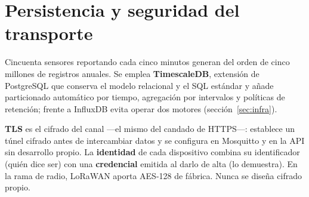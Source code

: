 

\section{Persistencia y seguridad del transporte}
\label{sec:persistencia}

Cincuenta sensores reportando cada cinco minutos generan del orden de cinco millones de registros
anuales. Se emplea \textbf{TimescaleDB}, extensión de PostgreSQL que conserva el modelo relacional y el
SQL estándar y añade particionado automático por tiempo, agregación por intervalos y políticas de
retención; frente a InfluxDB evita operar dos motores (sección~\ref{sec:infra}).

\textbf{TLS} es el cifrado del canal —el mismo del candado de HTTPS—: establece un túnel cifrado antes
de intercambiar datos y se configura en Mosquitto y en la API sin desarrollo propio. La
\textbf{identidad} de cada dispositivo combina su identificador (quién dice ser) con una
\textbf{credencial} emitida al darlo de alta (lo demuestra). En la rama de radio, LoRaWAN aporta
AES-128 de fábrica. Nunca se diseña cifrado propio.
